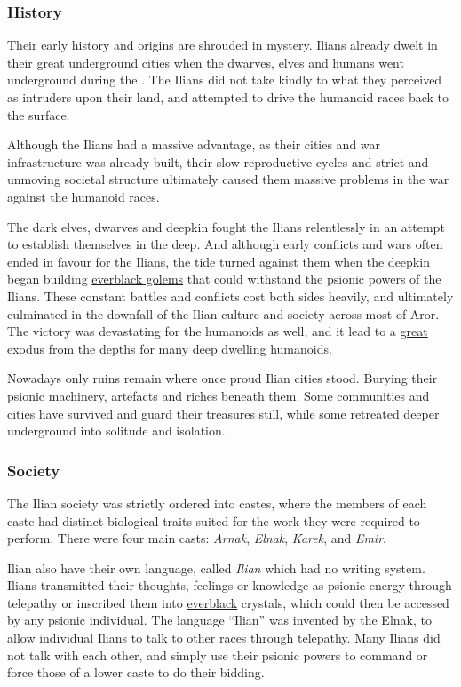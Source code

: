\subsubsection{History}

Their early history and origins are shrouded in mystery. Ilians already dwelt
in their great underground cities when the dwarves, elves and humans went
underground during the . The Ilians did not take kindly to
what they perceived as intruders upon their land, and attempted to drive the
humanoid races back to the surface.

Although the Ilians had a massive advantage, as their cities and war
infrastructure was already built, their slow reproductive cycles and strict
and unmoving societal structure ultimately caused them massive problems in
the war against the humanoid races.

The dark elves, dwarves and deepkin fought the Ilians relentlessly in an
attempt to establish themselves in the deep. And although early conflicts and
wars often ended in favour for the Ilians, the tide turned against them when
the deepkin began building \hyperref[sec:Everblack Golem]{everblack golems}
that could withstand the psionic powers of the Ilians. These constant battles
and conflicts cost both sides heavily, and ultimately culminated in the
downfall of the Ilian culture and society across most of Aror. The victory was
devastating for the humanoids as well, and it lead to a \hyperref[sec:Great
 Exodus]{great exodus from the depths} for many deep dwelling
humanoids.

Nowadays only ruins remain where once proud Ilian cities stood. Burying their
psionic machinery, artefacts and riches beneath them. Some communities and
cities have survived and guard their treasures still, while some retreated
deeper underground into solitude and isolation.

\subsubsection{Society}

The Ilian society was strictly ordered into castes, where the members of each
caste had distinct biological traits suited for the work they were required to
perform. There were four main casts: \emph{Arnak}, \emph{Elnak}, \emph{Karek},
and \emph{Emir}.

Ilian also have their own language, called \emph{Ilian} which had no writing
system. Ilians transmitted their thoughts, feelings or knowledge as psionic
energy through telepathy or inscribed them into
\hyperref[sec:Everblack]{everblack} crystals, which could then be accessed by
any psionic individual. The language ``Ilian'' was invented by the Elnak, to
allow individual Ilians to talk to other races through telepathy. Many Ilians
did not talk with each other, and simply use their psionic powers to command
or force those of a lower caste to do their bidding.

